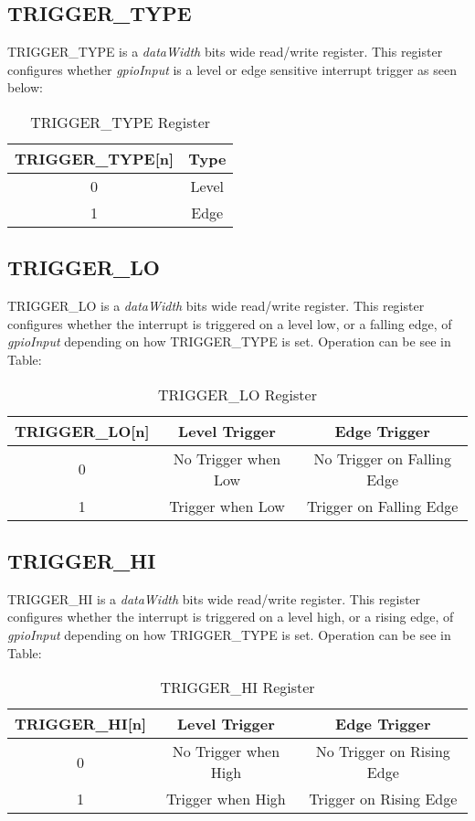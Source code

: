 \subsection{TRIGGER\_TYPE}
TRIGGER\_TYPE is a \textit{dataWidth} bits wide read/write register. This register configures whether \textit{gpioInput} is a level or edge sensitive
interrupt trigger as seen below:
\begin{table}[h]
  \centering
  \begin{tabular}{|c|c|}
      \hline
      \textbf{TRIGGER\_TYPE[n]} & \textbf{Type} \\ \hline
      0 & Level \\ \hline
      1 & Edge \\ \hline
  \end{tabular}
  \caption{TRIGGER\_TYPE Register}
\end{table}

\subsection{TRIGGER\_LO}
TRIGGER\_LO is a \textit{dataWidth} bits wide read/write register. This register configures whether the interrupt is triggered on a level low, or a falling edge, 
of \textit{gpioInput} depending on how TRIGGER\_TYPE is set. Operation can be see in Table:
\begin{table}[h]
  \centering
  \begin{tabular}{|c|c|c|}
      \hline
      \textbf{TRIGGER\_LO[n]} & \textbf{Level Trigger} & \textbf{Edge Trigger} \\ \hline
      0 & No Trigger when Low & No Trigger on Falling Edge\\ \hline
      1 & Trigger when Low & Trigger on Falling Edge\\ \hline
  \end{tabular}
  \caption{TRIGGER\_LO Register}
\end{table}

\subsection{TRIGGER\_HI}
TRIGGER\_HI is a \textit{dataWidth} bits wide read/write register. This register configures whether the interrupt is triggered on a level high, or a rising edge, 
of \textit{gpioInput} depending on how TRIGGER\_TYPE is set. Operation can be see in Table:
\begin{table}[h]
  \centering
  \begin{tabular}{|c|c|c|}
      \hline
      \textbf{TRIGGER\_HI[n]} & \textbf{Level Trigger} & \textbf{Edge Trigger} \\ \hline
      0 & No Trigger when High & No Trigger on Rising Edge\\ \hline
      1 & Trigger when High & Trigger on Rising Edge\\ \hline
  \end{tabular}
  \caption{TRIGGER\_HI Register}
\end{table}

